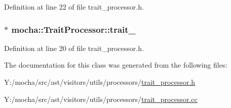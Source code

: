Definition at line 22 of file trait\_\-processor.h.

\hypertarget{classmocha_1_1_trait_processor_a8d94b8d55d770bec3d3b0b17cc626bf0}{
\subsubsection[{trait\_\-}]{$\ast$ {\bf mocha::TraitProcessor::trait\_\-}}}
\label{classmocha_1_1_trait_processor_a8d94b8d55d770bec3d3b0b17cc626bf0}


Definition at line 20 of file trait\_\-processor.h.



The documentation for this class was generated from the following files:\begin{DoxyCompactItemize}
\item 
Y:/mocha/src/ast/visitors/utils/processors/\hyperlink{trait__processor_8h}{trait\_\-processor.h}\item 
Y:/mocha/src/ast/visitors/utils/processors/\hyperlink{trait__processor_8cc}{trait\_\-processor.cc}\end{DoxyCompactItemize}
